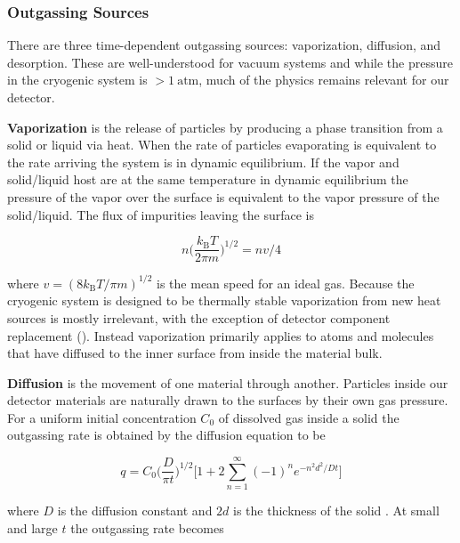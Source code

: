 \subsubsection{Outgassing Sources}
\label{subsubsec:electron_lifetime_model_outgassing_sources}
There are three time-dependent outgassing sources: vaporization, diffusion, and desorption.  These are well-understood for vacuum systems
and while the pressure in the cryogenic system is $> 1\ \mathrm{atm}$, much of the physics remains relevant for our detector.

\textbf{Vaporization} is the release of particles by producing a phase transition from a solid or liquid via heat.  When the rate of
particles evaporating is equivalent to the rate arriving the system is in dynamic equilibrium.  If the vapor and solid/liquid host are at
the same temperature in dynamic equilibrium the pressure of the vapor over the surface is equivalent to the vapor pressure of the
solid/liquid.  The flux of impurities leaving the surface is

\begin{equation}
n \bigg( \frac{k_{\mathrm{B}}T}{2 \pi m} \bigg)^{1/2} = nv/4
\end{equation}

\noindent where $v = (8k_{\mathrm{B}}T/\pi m)^{1/2}$ is the mean speed for an ideal gas.  Because the cryogenic system is designed to be
thermally stable vaporization from new heat sources is mostly irrelevant, with the exception of detector component replacement
().  Instead vaporization primarily applies to atoms and molecules that have diffused to the
inner surface from inside the material bulk.

\textbf{Diffusion} is the movement of one material through another.  Particles inside our detector materials are naturally drawn to the
surfaces by their own gas pressure.  For a uniform initial concentration $C_0$ of dissolved gas inside a solid the outgassing rate is
obtained by the diffusion equation to be

\begin{equation}
q = C_0 \bigg( \frac{D}{\pi t} \bigg)^{1/2} \Bigg[ 1 + 2 \sum_{n = 1}^{\infty} (-1)^n e^{-n^2 d^2 / Dt} \Bigg]
\label{eq:electron_lifetime_model_outgassing_sources_diffusion}
\end{equation}

\noindent where $D$ is the diffusion constant and $2d$ is the thickness of the solid .  At small and large $t$ the
outgassing rate becomes

